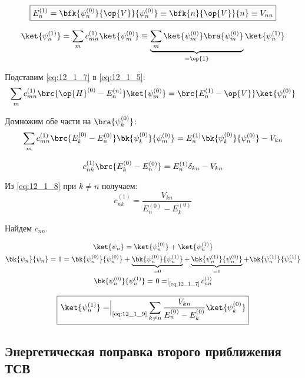 \begin{equation}
\label{eq:12_1_7}
\boxed{E_n^{(1)} = \bfk{\psi_n^{(0)}}{\op{V}}{\psi_n^{(0)}} \equiv \bfk{n}{\op{V}}{n} \equiv V_{nn}}
\end{equation}

$$
\ket{\psi_n^{(1)}} = \sum_m c_{mn}^{(1)} \ket{\psi_m^{(0)}} \equiv \underbrace{\sum_m \ket{\psi_m^{(0)}} \bra{\psi_m^{(0)}}}_{=\op{1}} \ket{\psi_n^{(1)}}
$$

Подставим \eqref{eq:12_1_7} в \eqref{eq:12_1_5}:
$$
\sum_m c_{mn}^{(1)} \brc{\op{H}^{(0)} - E_n^{(n)}}\ket{\psi_m^{(0)}} = \brc{E_n^{(1)} - \op{V}}\ket{\psi_n^{(0)}}
$$

Домножим обе части на $\bra{\psi_k^{(0)}}$:
$$
\sum_m c_{mn}^{(1)}\brc{E_k^{(0)} - E_n^{(0)}} \bk{\psi_k^{(0)}}{\psi_m^{(0)}} = E_n^{(1)} \bk{\psi_k^{(0)}}{\psi_n^{(0)}} - V_{kn}
$$

\begin{equation}
\label{eq:12_1_8}
c_{nk}^{(1)} \brc{E_k^{(0)} - E_n^{(0)}} = E_n^{(1)} \delta_{kn} - V_{kn}
\end{equation}

Из \eqref{eq:12_1_8} при $k \neq n$ получаем:
\begin{equation}
\label{eq:12_1_9}
c_{nk}^{(1)} = \frac{V_{kn}}{E_n^{(0)} - E_k^{(0)}}
\end{equation}

Найдем $c_{nn}$.

\begin{gather*}
\ket{\psi_n} = \ket{\psi_n^{(0)}} + \ket{\psi_n^{(1)}}\\
\bk{\psi_n}{\psi_n} = 1 = \bk{\psi_n^{(0)}}{\psi_n^{(0)}} + \underbrace{\bk{\psi_n^{(0)}}{\psi_n^{(1)}}}_{=0} + \underbrace{\bk{\psi_n^{(1)}}{\psi_n^{(0)}}}_{=0} + \bk{\psi_n^{(1)}}{\psi_n^{(1)}}\\
\bk{\psi_n^{(0)}}{\psi_n^{(1)}} = \left. 0 = \right|_{\text{\eqref{eq:12_1_7}}} c_{nn}^{(1)} 
\end{gather*}

\begin{equation}
\label{eq:12_1_10}
\boxed{\left. \ket{\psi_n^{(1)}}= \right|_{\text{\eqref{eq:12_1_9}}} \sum_{k \neq n} \frac{V_{kn}}{E_n^{(0)} - E_k^{(0)}} \ket{\psi_k^{(0)}}}
\end{equation}

\subsection{Энергетическая поправка второго приближения ТСВ}

